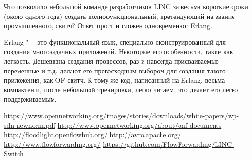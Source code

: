 \documentclass[10pt, a5paper]{article}
\begin{document}
Что позволило небольшой команде разработчиков LINC за весьма короткие сроки (около одного года) создать \cite{Orekhov6} полнофункциональный, претендующий на звание промышленного, свитч? Ответ прост и сложен одновременно: Erlang.

Erlang "--- это функциональный язык, специально сконструированный для создания многозадачных приложений. Некоторые его особенности, такие как легкость.  Дешевизна создания процессов, раз и навсегда присваиваемые переменные и т.д. делают его превосходным выбором для создания такого приложения, как OF свитч. К тому же код, написанный на Erlang, весьма компактен и, после небольшой тренировки, легко читаем, что делает его легко поддерживаемым. 

\begin{thebibliography}{9}

 \url{https://www.opennetworking.org/images/stories/downloads/white-papers/wp-sdn-newnorm.pdf}
 \url{http://www.opennetworking.org/about/onf-documents}
 \url{http://floodlight.openflowhub.org/}
 \url{http://avro.apache.org/}
 \url{http://www.flowforwarding.org/}
 \url{https://github.com/FlowForwarding/LINC-Switch}
\end{thebibliography}
\end{document}
